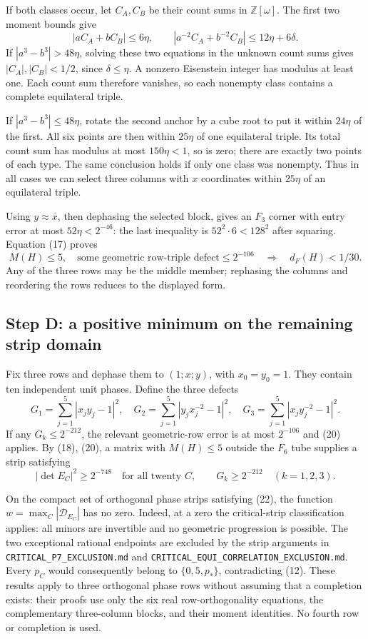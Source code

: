 \documentclass[11pt]{article}
\begin{document}
If both classes occur, let $C_A,C_B$ be their count sums in
$\mathbb Z[\omega]$. The first two moment bounds give
\[
 |aC_A+bC_B|\le6\eta,\qquad
 |a^{-2}C_A+b^{-2}C_B|\le12\eta+6\delta.
\]
If $|a^3-b^3|>48\eta$, solving these two equations in the unknown
count sums gives $|C_A|,|C_B|<1/2$, since $\delta\le\eta$.
A nonzero Eisenstein integer has modulus at least one. Each count sum
therefore vanishes, so each nonempty class contains a complete
equilateral triple.

If $|a^3-b^3|\le48\eta$, rotate the second anchor by a cube root
to put it within $24\eta$ of the first. All six points are then within
$25\eta$ of one equilateral triple. Its total count sum has modulus
at most $150\eta<1$, so is zero; there are exactly two points of each
type. The same conclusion holds if only one class was nonempty.
Thus in all cases we can select three columns with
$x$ coordinates within $25\eta$ of an equilateral triple.

Using $y\approx\overline{x}$, then dephasing the selected block, gives
an $F_3$ corner with entry error at most $52\eta<2^{-46}$:
the last inequality is $52^2\cdot6<128^2$ after squaring.
Equation (17) proves
\[
 M(H)\le5,\quad\text{some geometric row-triple defect}\le2^{-106}
 \quad\Longrightarrow\quad d_F(H)<1/30.\tag{20}
\]
Any of the three rows may be the middle member; rephasing the columns
and reordering the rows reduces to the displayed form.

\subsection*{Step D: a positive minimum on the remaining strip domain}
Fix three rows and dephase them to $(1;x;y)$, with $x_0=y_0=1$.
They contain ten independent unit phases. Define the three defects
\[
 G_1=\sum_{j=1}^5|x_jy_j-1|^2,\quad
 G_2=\sum_{j=1}^5|y_jx_j^{-2}-1|^2,\quad
 G_3=\sum_{j=1}^5|x_jy_j^{-2}-1|^2.\tag{21}
\]
If any $G_k\le2^{-212}$, the relevant geometric-row error is at
most $2^{-106}$ and (20) applies. By (18), (20), a matrix with
$M(H)\le5$ outside the $F_6$ tube supplies a strip satisfying
\[
 |\det E_C|^2\ge2^{-748}\quad\text{for all twenty }C,
 \qquad G_k\ge2^{-212}\quad(k=1,2,3).\tag{22}
\]

On the compact set of orthogonal phase strips satisfying (22), the
function $w=\max_C|\mathcal D_{E_C}|$ has no zero.
Indeed, at a zero the critical-strip classification applies: all
minors are invertible and no geometric progression is possible.
The two exceptional rational endpoints are excluded by the strip
arguments in \texttt{CRITICAL\_P7\_EXCLUSION.md} and
\texttt{CRITICAL\_EQUI\_CORRELATION\_EXCLUSION.md}.
Every $p_C$ would consequently belong to $\{0,5,p_*\}$, contradicting
(12). These results apply to three orthogonal phase rows without
assuming that a completion exists: their proofs use only the six real
row-orthogonality equations, the complementary three-column blocks,
and their moment identities. No fourth row or completion is used.
\end{document}
